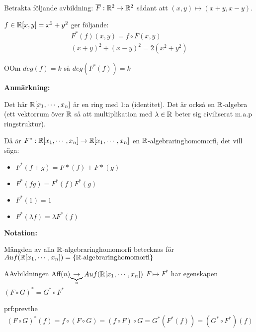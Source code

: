 \par
\noindent Betrakta följande avbildning: $\overline{F}:\mathbb{R}^2\to\mathbb{R}^2$ sådant att $(x,y)\mapsto(x+y,x-y)$.\par
\noindent $f\in \mathbb{R}[x,y] = x^2+y^2$ ger följande:
\begin{equation*}
  \begin{gathered}
    F^*(f)(x,y) = f\circ\overline{F}(x,y)\\
    (x+y)^2+(x-y)^2 = 2(x^2+y^2)
  \end{gathered}
\end{equation*}
\par\bigskip
\begin{theo}
  OOm $deg(f) =k$ så $deg(F^*(f))=k$
\end{theo}
\par\bigskip
\noindent\textbf{Anmärkning:}\par
\noindent Det här $\mathbb{R}[x_1,\cdots,x_n]$ är en ring med $1$:a (identitet). Det är också en $\mathbb{R}$-algebra (ett vektorrum över $\mathbb{R}$ så att multiplikation med $\lambda\in\mathbb{R}$ beter sig civiliserat m.a.p ringstruktur).
\par\bigskip
\noindent Då är $F^*:\mathbb{R}[x_1,\cdots,x_n]\to\mathbb{R}[x_1,\cdots,x_n]$ en $\mathbb{R}$-algebraringhomomorfi, det vill säga:
\begin{itemize}
  \item $F^*(f+g) = F*(f)+F*(g)$
  \item $F^*(fg) = F^*(f)F^*(g)$
  \item $F^*(1) = 1$
  \item $F^*(\lambda f) = \lambda F^*(f)$
\end{itemize}
\par\bigskip
\noindent\textbf{Notation:}\par
\noindent Mängden av alla $\mathbb{R}$-algebraringhomomorfi betecknas för $Auf(\mathbb{R}[x_1,\cdots,x_n]) = \{\mathbb{R}\text{-algebraringhomomorfi}\}$
\par\bigskip
\begin{theo}
  AAvbildningen Aff($n$)$\underbrace{\to}_{\text{*}}Auf(\mathbb{R}[x_1,\cdots,x_n])$ $F\mapsto F^*$ har egenskapen $(F\circ G)^* = G^*\circ F^*$
\end{theo}
\par\bigskip
\begin{prf}{prf:prevthe}
  \begin{equation*}
    \begin{gathered}
      (F\circ G)^*(f) = f\circ (F\circ G) = (f\circ F)\circ G = G^*(F^*(f)) = (G^*\circ F^*)(f)
    \end{gathered}
  \end{equation*}
\end{prf}
